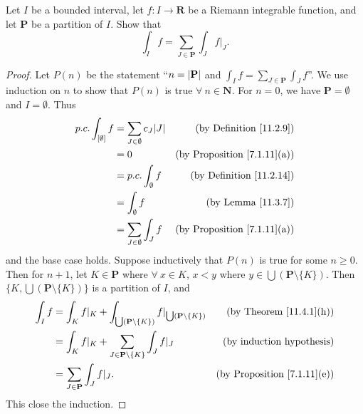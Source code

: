 \begin{exercise}\label{ex 11.4.3}
    Let \(I\) be a bounded interval, let \(f : I \to \mathbf{R}\) be a Riemann integrable function, and let \(\mathbf{P}\) be a partition of \(I\).
    Show that
    \[
        \int_I f = \sum_{J \in \mathbf{P}} \int_J f|_J.
    \]
\end{exercise}

\begin{proof}
    Let \(P(n)\) be the statement ``\(n = \abs*{\mathbf{P}}\) and \(\int_I f = \sum_{J \in \mathbf{P}} \int_J f\)''.
    We use induction on \(n\) to show that \(P(n)\) is true \(\forall\ n \in \mathbf{N}\).
    For \(n = 0\), we have \(\mathbf{P} = \emptyset\) and \(I = \emptyset\).
    Thus
    \begin{align*}
        p.c. \int_{[\emptyset]} f & = \sum_{J \in \emptyset} c_J \abs*{J} & \text{(by Definition \ref{11.2.9})}     \\
                                  & = 0                                   & \text{(by Proposition \ref{7.1.11}(a))} \\
                                  & = p.c. \int_{\emptyset} f             & \text{(by Definition \ref{11.2.14})}    \\
                                  & = \int_{\emptyset} f                  & \text{(by Lemma \ref{11.3.7})}          \\
                                  & = \sum_{J \in \emptyset} \int_J f     & \text{(by Proposition \ref{7.1.11}(a))}
    \end{align*}
    and the base case holds.
    Suppose inductively that \(P(n)\) is true for some \(n \geq 0\).
    Then for \(n + 1\), let \(K \in \mathbf{P}\) where \(\forall\ x \in K\), \(x < y\) where \(y \in \bigcup (\mathbf{P} \setminus \{K\})\).
    Then \(\{K, \bigcup (\mathbf{P} \setminus \{K\})\}\) is a partition of \(I\), and
    \begin{align*}
        \int_I f & = \int_K f|_K + \int_{\bigcup (\mathbf{P} \setminus \{K\})} f|_{\bigcup (\mathbf{P} \setminus \{K\})} & \text{(by Theorem \ref{11.4.1}(h))}     \\
                 & = \int_K f|_K + \sum_{J \in \mathbf{P} \setminus \{K\}} \int_J f|_J                                   & \text{(by induction hypothesis)}        \\
                 & = \sum_{J \in \mathbf{P}} \int_J f|_J.                                                                & \text{(by Proposition \ref{7.1.11}(e))}
    \end{align*}
    This close the induction.
\end{proof}

